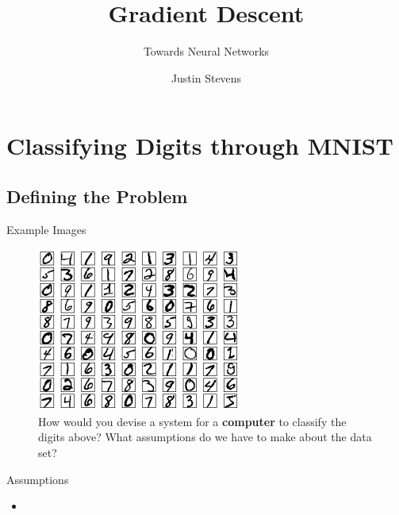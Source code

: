 \documentclass[xcolor=dvipsnames, fontsize=11pt, %
pagesize, %
parskip=half-, t]{beamer}
\title[Artificial Intelligence for Beginners]{Gradient Descent}
\subtitle{Towards Neural Networks}
\author[Justin Stevens]{\large Justin Stevens} %
\date{}
\begin{document}
	\renewcommand{\thefootnote}{\fnsymbol{footnote}}
	\begin{frame}[c]
	\centering
	\titlepage
\end{frame}
\section{Classifying Digits through MNIST}
\subsection{Defining the Problem}
\begin{frame}{Example Images}
\begin{figure} 
\center
\includegraphics{mnist_100_digits.png}
\caption{How would you devise a system for a \textbf{computer} to classify the digits above? What assumptions do we have to make about the data set? }
\end{figure}
\end{frame}

\begin{frame}{Assumptions}
\begin{itemize}
\item 
\end{itemize}
\end{frame}
\end{document}
